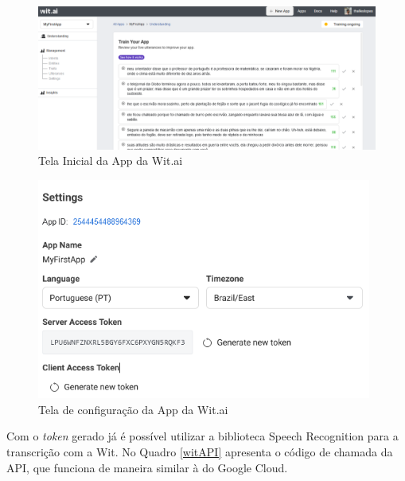 \begin{figure}[h!]
\centering
\caption{Tela Inicial da App da Wit.ai}
\label{witAppInicio}
\includegraphics[width=160mm]{images/ConfigurarWit/witHistoricoTranscricao.PNG}
\end{figure}

\begin{figure}[h!]
\centering
\caption{Tela de configuração da App da Wit.ai}
\label{witAppSettings}
\includegraphics[width=110mm]{images/ConfigurarWit/witSettings.PNG}
\end{figure}

\FloatBarrier

Com o \textit{token} gerado já é possível utilizar a biblioteca Speech Recognition para a transcrição com a Wit. No Quadro \autoref{witAPI} apresenta o código de chamada da API, que funciona de maneira similar à do Google Cloud.


